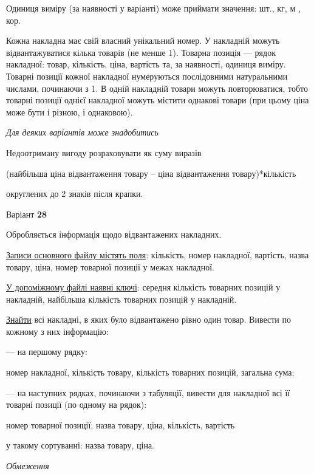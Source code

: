 \documentclass[11pt, ukrainian]{article}
\begin{document}
Одиниця виміру (за наявності у варіанті) може приймати значення: шт., кг, м , кор.

Кожна накладна має свій власний унікальний номер.
У накладній можуть відвантажуватися кілька товарів (не менше 1).
Товарна позиція --- рядок накладної: товар, кількість, ціна, вартість та, за наявності, одиниця виміру.
Товарні позиції кожної накладної нумеруються послідовними натуральними числами, починаючи з 1.
В одній накладній товари можуть повторюватися, 
тобто товарні позиції однієї накладної можуть містити однакові товари 
(при цьому ціна може бути і різною, і однаковою).

\bigskip\textit{Для деяких варіантів може знадобитись}

Недоотриману вигоду розраховувати як суму виразів
{\center (найбільша ціна відвантаження товару – ціна відвантаження товару)*кількість\par}

\bigskip
{\noindent} округлених до 2 знаків після крапки.


\par
\newpage
{\center Варіант  \No \textbf { 28 }\par}
\bigskip
Обробляється інформація щодо відвантажених накладних.

\underline{Записи основного файлу містять поля}: кількість, номер накладної, вартість, назва товару, ціна, номер товарної позиції у межах накладної.

\underline{У допоміжному файлі наявні ключі}: середня кількість товарних позицій у накладній, найбільша кількість товарних позицій у накладній.

\underline{Знайти} всі накладні, в яких було відвантажено рівно один товар. Вивести по кожному з них інформацію:\par
{\noindent}--- на першому рядку:\par
номер накладної, кількість товару, кількість товарних позицій, загальна сума;

{\noindent}--- на наступних рядках, починаючи з табуляції, вивести для накладної всі її товарні позиції (по одному на рядок):\par
номер товарної позиції, назва товару, ціна, кількість, вартість

{\noindent}у такому сортуванні: назва товару, ціна.


\bigskip\textit{Обмеження}
\end{document}
